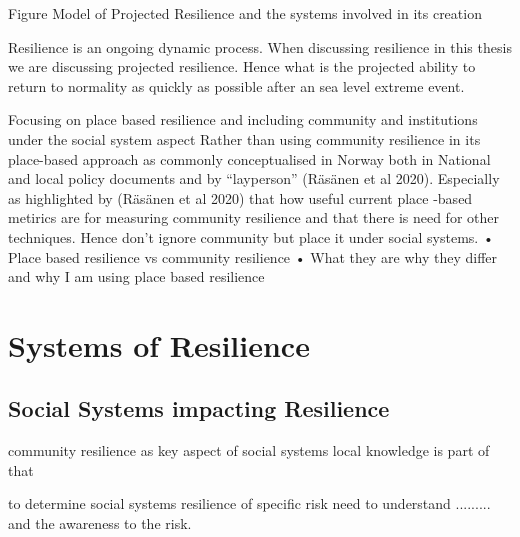 \begin{frame}{Figure Model of Projected Resilience and the systems involved in its creation }
\end{frame}

Resilience is an ongoing dynamic process. When discussing resilience in this thesis we are discussing projected resilience. Hence what is the projected ability to return to normality as quickly as possible after an sea level extreme event. 
 
Focusing on place based resilience and including community and institutions under the social system aspect
Rather than using community resilience in its place-based approach as commonly conceptualised in Norway both in National and local policy documents and by “layperson” (Räsänen et al 2020). Especially as highlighted by (Räsänen et al 2020) that how useful current place -based metirics are for measuring community resilience and that there is need for other techniques. Hence don’t ignore community but place it under social systems. 
•	Place based resilience vs community resilience
•	What they are why they differ and why I am using place based resilience

\section{Systems of Resilience }

\subsection{Social Systems impacting Resilience}
community resilience as key aspect of social systems
local knowledge is part of that

to determine social systems resilience of specific risk need to understand ......... and the awareness to the risk. 

